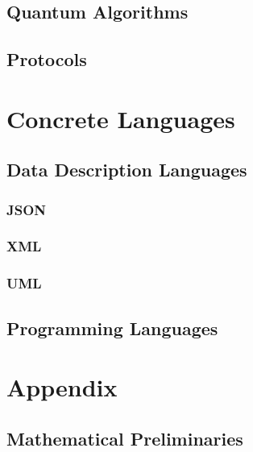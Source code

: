 \documentclass{book}
\begin{document}
\chapter{Quantum Algorithms}

\chapter{Protocols}

\part{Concrete Languages}

\chapter{Data Description Languages}
 
 \section{JSON}

 \section{XML}
 
 \section{UML}

\chapter{Programming Languages}
 

%
%  

\part{Appendix}

\appendix

\chapter{Mathematical Preliminaries}\label{sec:math}



\tocentryBib


%
%
%
\end{document}
